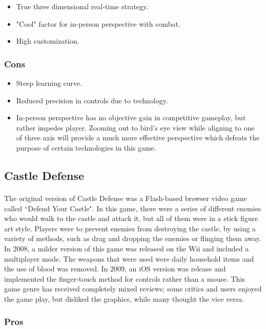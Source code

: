 \begin{itemize}
	\item True three dimensional real-time strategy.
	\item "Cool" factor for in-person perspective with combat.
	\item High customization.
\end{itemize}

\subsubsection{Cons}

\begin{itemize}
	\item Steep learning curve.
	\item Reduced precision in controls due to technology.
	\item In-person perspective has no objective gain in competitive gameplay, but rather impedes player. Zooming out to bird's eye view while aligning to one of three axis will provide a much more effective perspective which defeats the purpose of certain technologies in this game.
\end{itemize}

\subsection{Castle Defense}

\paragraph{} The original version of Castle Defense was a Flash-based browser video game called ``Defend Your Castle". In this game, there were a series of different enemies who would walk to the castle and attack it, but all of them were in a stick figure art style. Players were to prevent enemies from destroying the castle, by using a variety of methods, such as drag and dropping the enemies or flinging them away. In 2008, a milder version of this game was released on the Wii and included a multiplayer mode. The weapons that were used were daily household items and the use of blood was removed. In 2009, an iOS version was release and implemented the finger-touch method for controls rather than a mouse. This game genre has received completely mixed reviews; some critics and users enjoyed the game play, but disliked the graphics, while many thought the vice versa.

\subsubsection{Pros}


